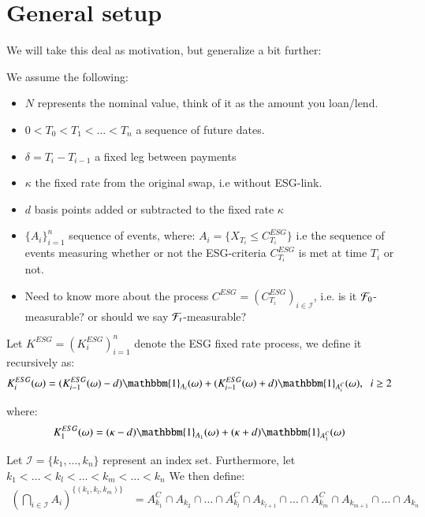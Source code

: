 \section{General setup}
We will take this deal as motivation, but generalize a bit further:
\begin{assumption}
We assume the following: 
\begin{itemize}[leftmargin=*]
    \item $N$ represents the nominal value, think of it as the amount you loan/lend.
    \item $0 < T_{0} < T_{1} < \dots < T_{n}$ a sequence of future dates. 
    \item $\delta = T_{i} - T_{i-1}$ a fixed leg between payments 
    \item $\kappa$ the fixed rate from the original swap, i.e without ESG-link. 
    \item $d$ basis points added or subtracted to the fixed rate $\kappa$
    \item $\{A_{i}\}_{i=1}^{n}$ sequence of events, where: 
    $A_{i} = \{X_{T_{i}} \leq C_{T_{i}}^{ESG}\}$ i.e the sequence of events measuring whether or not the ESG-criteria $C_{T_{i}}^{ESG}$ is met at time $T_{i}$ or not. 
    \item Need to know more about the process $C^{ESG} = (C_{T_{i}}^{ESG})_{i \in \mathcal{I}}$, i.e. is it $\mathcal{F}_{0}$-measurable? or should we say $\mathcal{F}_{t}$-measurable?
\end{itemize}
\end{assumption} 


\begin{definition}
Let $K^{ESG} = (K_{i}^{ESG})_{i=1}^{n}$ 
denote the ESG fixed rate process, we define it recursively as: 
\begin{align*}
K_{i}^{ESG}(\omega) &= (K_{i-1}^{ESG}(\omega)-d)\mathbbm{1}_{A_{i}}(\omega)
+ (K_{i-1}^{ESG}(\omega)+d)\mathbbm{1}_{A_{i}^{C}}(\omega), \;\; i\geq 2
\end{align*}

where:
\begin{align*}
K_{1}^{ESG}(\omega) &= (\kappa - d)\mathbbm{1}_{A_{1}}(\omega)
+ (\kappa + d)\mathbbm{1}_{A_{1}^{C}}(\omega)    
\end{align*}
\end{definition} 

\begin{notation}
Let $\mathcal{I} = \{k_{1}, \dots, k_{n}\}$ represent an index set. Furthermore, let\\ 
$k_{1}< \dots < k_{l} < \dots < k_{m}< \dots < k_{n}$ We then define:
\begin{align*}
\left(
\bigcap_{i\in \mathcal{I}}A_{i}
\right)^{
\{(k_{1}, k_{l}, k_{m})\}
}
&= 
A_{k_{1}}^{C}\cap A_{k_{2}} \cap \dots\cap A_{k_{l}}^{C}\cap
A_{k_{l+1}}\cap \dots \cap A_{k_{m}}^{C}\cap A_{k_{m+1}}\cap \dots \cap A_{k_{n}}
\end{align*}
\end{notation}

